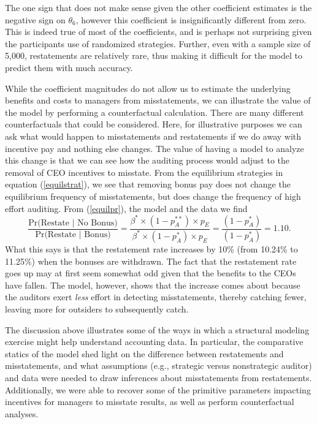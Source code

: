 The one sign that does not make sense given the other coefficient estimates is the negative sign on $\theta_6$, however this coefficient is insignificantly different from zero.
This is indeed true of most of the coefficients, and is perhaps not surprising given the participants use of randomized strategies.
Further, even with a sample size of 5,000, restatements are relatively rare, thus making it difficult for the model to predict them with much accuracy. 

While the coefficient magnitudes do not allow us to estimate the underlying benefits and costs to managers from misstatements, we can illustrate the value of the model by performing a counterfactual calculation.
There are many different counterfactuals that could be considered. 
Here, for illustrative purposes we can ask what would happen to misstatements and restatements if we  do away with incentive pay and nothing else changes.
The value of having a model to analyze this
change is that we can see how the auditing process would adjust to the removal of 
CEO incentives to misstate. 
From the equilibrium strategies in equation (\ref{equilstrat}), we see that removing bonus pay does not
change the equilibrium frequency of misstatements, but does change the frequency of high effort auditing.
From (\ref{equilpr}), the model and the data we find
$$ \dfrac{\mbox{Pr(Restate }\vert \mbox{ No Bonus)}}{\mbox{Pr(Restate }\vert \mbox{ Bonus)}}=\dfrac{\beta^* \times (1-p_A^{**}) \times p_{E}}
{\beta^* \times (1-p_A^{*}) \times p_{E}} = \dfrac{(1-p_A^*)}{(1-p_A^*)} = 1.10.$$
What this says is that the restatement rate increases by 10\% (from 10.24\% to 11.25\%) when the bonuses
are withdrawn. 
The fact that the restatement rate goes up may at first seem somewhat odd given that the benefits to the CEOs have fallen. 
The model, however, shows that the increase  comes about because the auditors exert \emph{less} effort in detecting misstatements, thereby catching fewer, leaving more for outsiders to subsequently catch.  

The discussion above illustrates some of the ways in which a structural modeling exercise might help understand accounting data. 
In particular, the comparative statics of the model shed light on the difference between restatements and misstatements, and what assumptions (e.g., strategic versus nonstrategic auditor) and data were needed to draw  inferences about misstatements from restatements. 
Additionally, we were able to recover some of the primitive parameters impacting incentives for managers to misstate results, as well as perform counterfactual analyses.

